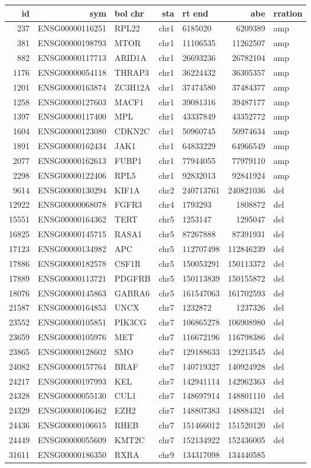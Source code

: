 \documentclass[]{article}
\begin{document}
\begin{longtable}[]{@{}rrlrlrl@{}}
\toprule
id & sym & bol chr & sta & rt end & abe & rration\tabularnewline
\midrule
\endhead
237 & ENSG00000116251 & RPL22 & chr1 & 6185020 & 6209389 &
amp\tabularnewline
381 & ENSG00000198793 & MTOR & chr1 & 11106535 & 11262507 &
amp\tabularnewline
882 & ENSG00000117713 & ARID1A & chr1 & 26693236 & 26782104 &
amp\tabularnewline
1176 & ENSG00000054118 & THRAP3 & chr1 & 36224432 & 36305357 &
amp\tabularnewline
1201 & ENSG00000163874 & ZC3H12A & chr1 & 37474580 & 37484377 &
amp\tabularnewline
1258 & ENSG00000127603 & MACF1 & chr1 & 39081316 & 39487177 &
amp\tabularnewline
1397 & ENSG00000117400 & MPL & chr1 & 43337849 & 43352772 &
amp\tabularnewline
1604 & ENSG00000123080 & CDKN2C & chr1 & 50960745 & 50974634 &
amp\tabularnewline
1891 & ENSG00000162434 & JAK1 & chr1 & 64833229 & 64966549 &
amp\tabularnewline
2077 & ENSG00000162613 & FUBP1 & chr1 & 77944055 & 77979110 &
amp\tabularnewline
2298 & ENSG00000122406 & RPL5 & chr1 & 92832013 & 92841924 &
amp\tabularnewline
9614 & ENSG00000130294 & KIF1A & chr2 & 240713761 & 240821036 &
del\tabularnewline
12922 & ENSG00000068078 & FGFR3 & chr4 & 1793293 & 1808872 &
del\tabularnewline
15551 & ENSG00000164362 & TERT & chr5 & 1253147 & 1295047 &
del\tabularnewline
16825 & ENSG00000145715 & RASA1 & chr5 & 87267888 & 87391931 &
del\tabularnewline
17123 & ENSG00000134982 & APC & chr5 & 112707498 & 112846239 &
del\tabularnewline
17886 & ENSG00000182578 & CSF1R & chr5 & 150053291 & 150113372 &
del\tabularnewline
17889 & ENSG00000113721 & PDGFRB & chr5 & 150113839 & 150155872 &
del\tabularnewline
18076 & ENSG00000145863 & GABRA6 & chr5 & 161547063 & 161702593 &
del\tabularnewline
21587 & ENSG00000164853 & UNCX & chr7 & 1232872 & 1237326 &
del\tabularnewline
23552 & ENSG00000105851 & PIK3CG & chr7 & 106865278 & 106908980 &
del\tabularnewline
23659 & ENSG00000105976 & MET & chr7 & 116672196 & 116798386 &
del\tabularnewline
23865 & ENSG00000128602 & SMO & chr7 & 129188633 & 129213545 &
del\tabularnewline
24082 & ENSG00000157764 & BRAF & chr7 & 140719327 & 140924928 &
del\tabularnewline
24217 & ENSG00000197993 & KEL & chr7 & 142941114 & 142962363 &
del\tabularnewline
24328 & ENSG00000055130 & CUL1 & chr7 & 148697914 & 148801110 &
del\tabularnewline
24329 & ENSG00000106462 & EZH2 & chr7 & 148807383 & 148884321 &
del\tabularnewline
24436 & ENSG00000106615 & RHEB & chr7 & 151466012 & 151520120 &
del\tabularnewline
24449 & ENSG00000055609 & KMT2C & chr7 & 152134922 & 152436005 &
del\tabularnewline
31611 & ENSG00000186350 & RXRA & chr9 & 134317098 & 134440585 &

\end{longtable}
\end{document}
